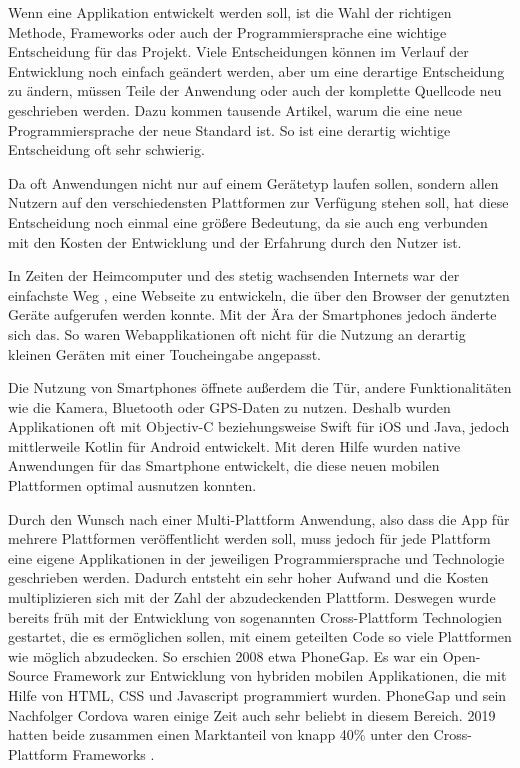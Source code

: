 Wenn eine Applikation entwickelt werden soll, ist die Wahl der richtigen Methode, Frameworks oder auch der Programmiersprache eine wichtige Entscheidung für das Projekt. Viele Entscheidungen können im Verlauf der Entwicklung noch einfach geändert werden, aber um eine derartige Entscheidung zu ändern, müssen Teile der Anwendung oder auch der komplette Quellcode neu geschrieben werden. Dazu kommen tausende Artikel, warum die eine neue Programmiersprache der neue Standard ist. So ist eine derartig wichtige Entscheidung oft sehr schwierig.

Da oft Anwendungen nicht nur auf einem Gerätetyp laufen sollen, sondern allen Nutzern auf den verschiedensten Plattformen zur Verfügung stehen soll, hat diese Entscheidung noch einmal eine größere Bedeutung, da sie auch eng verbunden mit den Kosten der Entwicklung und der Erfahrung durch den Nutzer ist.

In Zeiten der Heimcomputer und des stetig wachsenden Internets war der einfachste Weg , eine Webseite zu entwickeln, die über den Browser der genutzten Geräte aufgerufen werden konnte. Mit der Ära der Smartphones jedoch änderte sich das. So waren Webapplikationen oft nicht für die Nutzung an derartig kleinen Geräten mit einer Toucheingabe angepasst.

Die Nutzung von Smartphones öffnete außerdem die Tür, andere Funktionalitäten wie die Kamera, Bluetooth oder GPS-Daten zu nutzen. Deshalb wurden Applikationen oft mit Objectiv-C beziehungsweise Swift für iOS und Java, jedoch mittlerweile Kotlin für Android entwickelt. Mit deren Hilfe wurden native Anwendungen für das Smartphone entwickelt, die diese neuen mobilen Plattformen optimal ausnutzen konnten.

Durch den Wunsch nach einer Multi-Plattform Anwendung, also dass die App für mehrere Plattformen veröffentlicht werden soll, muss jedoch für jede Plattform eine eigene Applikationen in der jeweiligen Programmiersprache und Technologie geschrieben werden. Dadurch entsteht ein sehr hoher Aufwand und die Kosten multiplizieren sich mit der Zahl der abzudeckenden Plattform. Deswegen wurde bereits früh mit der Entwicklung von sogenannten Cross-Plattform Technologien gestartet, die es ermöglichen sollen, mit einem geteilten Code so viele Plattformen wie möglich abzudecken. So erschien 2008 etwa PhoneGap. Es war ein Open-Source Framework zur Entwicklung von hybriden mobilen Applikationen, die mit Hilfe von HTML, CSS und Javascript programmiert wurden. PhoneGap und sein Nachfolger Cordova waren einige Zeit auch sehr beliebt in diesem Bereich. 2019 hatten beide zusammen einen Marktanteil von knapp 40\% unter den Cross-Plattform Frameworks \cite{statist_CP_Framework}.

